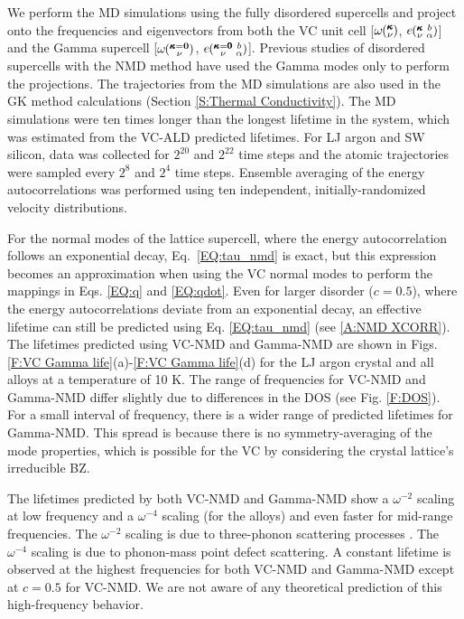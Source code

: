 \documentclass[aps,prb,onecolumn,preprint,footinbib,superscriptaddress,amsmath,amssymb,floatfix]{revtex4}
\newcommand{\kvba}{\mspace{-4.0mu}\left(\mspace{-8.0mu}
\begin{smallmatrix} &\pmb{\kappa} &b \\ &\nu &\alpha\end{smallmatrix}
\mspace{-3.0mu}\right)}
\newcommand{\kgvba}{\mspace{-4.0mu}\left(\mspace{-8.0mu}
\begin{smallmatrix} &\pmb{\kappa}=\pmb{0} &b \\ &\nu 
&\alpha\end{smallmatrix}\mspace{-3.0mu}\right)}
\newcommand{\kv}{\mspace{-4.0mu}\left(\mspace{-8.0mu}
\begin{smallmatrix}&\pmb{\kappa} \\&\nu\end{smallmatrix}
\mspace{-3.0mu}\right)}
\newcommand{\kgv}{\mspace{-4.0mu}\left(\mspace{-8.0mu}
\begin{smallmatrix}&\pmb{\kappa}=\mathbf{0} \\&\nu\end{smallmatrix}
\mspace{-3.0mu}\right)}
\begin{document}
We perform the MD simulations using the fully disordered supercells  
and project onto the frequencies and eigenvectors 
from both the VC unit cell [$\omega\kv$, $e\kvba$] and the 
Gamma supercell [$\omega\kgv$, $e\kgvba$]. Previous studies of 
disordered supercells with the 
NMD method have used the Gamma modes only to perform the projections.
\cite{donadio_atomistic_2009,he_heat_2011,he_morphology_2011,
he_lattice_2012,hori_phonon_2013} 
The trajectories from 
the MD simulations are also used in the GK method calculations
(Section \ref{S:Thermal Conductivity}). 
The MD simulations were ten times longer than the 
longest lifetime in the system, which was  
estimated from the VC-ALD predicted lifetimes. For LJ 
argon and SW silicon, data was collected for $2^{20}$ and 
$2^{22}$ time steps and the atomic trajectories were sampled 
every $2^8$ and $2^4$ time steps. 
Ensemble averaging of the energy autocorrelations was performed 
using ten independent, initially-randomized velocity distributions. 

For the normal modes of the lattice supercell, where the energy 
autocorrelation follows an 
exponential decay,\cite{ladd_lattice_1986,turney_predicting_2009-1} 
Eq.~\eqref{EQ:tau_nmd} is exact, but this expression becomes an 
approximation when 
using the VC normal modes to perform the mappings in Eqs.  
\eqref{EQ:q} and \eqref{EQ:qdot}. 
Even for larger disorder ($c=0.5$),  
where the energy autocorrelations 
deviate from an exponential decay, 
an effective lifetime can still be predicted 
using Eq. \eqref{EQ:tau_nmd} (see \ref{A:NMD XCORR}). 
The lifetimes predicted using VC-NMD and Gamma-NMD  
are shown in Figs. \ref{F:VC Gamma life}(a)-\ref{F:VC Gamma life}(d) 
for the LJ argon crystal and all alloys at a temperature of 10 K. 
The range of frequencies for 
VC-NMD and Gamma-NMD differ slightly due to differences in 
the DOS (see Fig. \ref{F:DOS}). 
For a small interval of frequency, there is a wider range of 
predicted lifetimes for Gamma-NMD. This spread is because there 
is no symmetry-averaging of the mode properties, 
which is possible for the VC by considering the crystal 
lattice's irreducible BZ.\cite{ashcroft_solid_1976} 

The lifetimes predicted by both VC-NMD and Gamma-NMD 
show a $\omega^{-2}$ scaling at low frequency and a $\omega^{-4}$ 
scaling (for the alloys) and 
even faster for mid-range frequencies. The $\omega^{-2}$ scaling 
is due to three-phonon scattering processes
\cite{callaway_model_1959,maradudin_scattering_1962}. The 
$\omega^{-4}$ scaling is due to phonon-mass point defect 
scattering.\cite{klemens_scattering_1955,klemens_thermal_1957,mattis_phonon_1957,tamura_isotope_1983} 
A constant lifetime is observed at the highest frequencies  
for both VC-NMD and Gamma-NMD except at $c=0.5$ for VC-NMD. We are not 
aware of any theoretical prediction of this high-frequency behavior.
\end{document}

